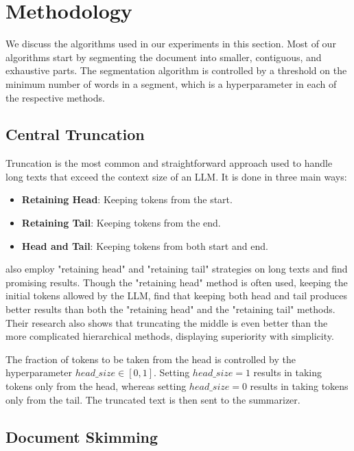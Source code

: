 \section{Methodology}
	\label{sec:methodology}

	We discuss the algorithms used in our experiments in this section.
	Most of our algorithms start by segmenting the document into smaller, contiguous, and
	exhaustive parts.
	The segmentation algorithm is controlled by a threshold on the minimum number of words
	in a segment, which is a hyperparameter in each of the respective methods.


	\subsection{Central Truncation}
		\label{method:truncation}

		Truncation is the most common and straightforward approach used to handle long texts
		that exceed the context size of an LLM.
		It is done in three main ways:

		\begin{itemize}
			\item \textbf{Retaining Head}: Keeping tokens from the start.
			\item \textbf{Retaining Tail}: Keeping tokens from the end.
			\item \textbf{Head and Tail}: Keeping tokens from both start and end.
		\end{itemize}

		\citet{worsham-kalita-2018-genre} also employ "retaining head" and "retaining tail"
		strategies on long texts and find promising results.
		Though the "retaining head" method is often used, keeping the initial tokens allowed by
		the LLM, \citet{sun2019fine} find that keeping both head and tail produces better results
		than both the "retaining head" and the "retaining tail" methods.
		Their research also shows that truncating the middle is even better than the more
		complicated hierarchical methods, displaying superiority with simplicity.

		The fraction of tokens to be taken from the head is controlled by the hyperparameter
		$head\_size \in [0, 1]$.
		Setting $head\_size = 1$ results in taking tokens only from the head, whereas
		setting $head\_size = 0$ results in taking tokens only from the tail.
		The truncated text is then sent to the summarizer.


	\subsection{Document Skimming}
		\label{method:skimming}

